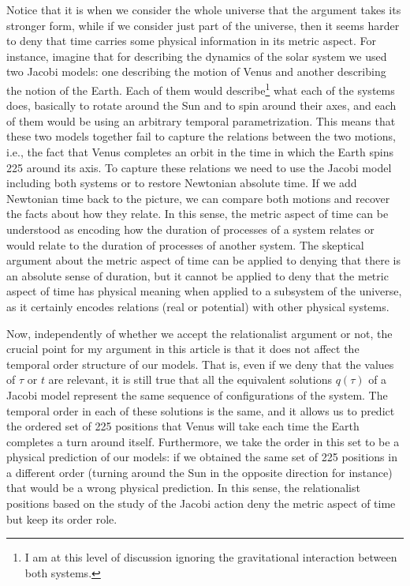 \documentclass[12 pt]{article}
\begin{document}
Notice that it is when we consider the whole universe that the argument takes its stronger form, while if we consider just part of the universe, then it seems harder to deny that time carries some physical information in its metric aspect. For instance, imagine that for describing the dynamics of the solar system we used two Jacobi models: one describing the motion of Venus and another describing the notion of the Earth. Each of them would describe\footnote{I am at this level of discussion ignoring the gravitational interaction between both systems.} what each of the systems does, basically to rotate around the Sun and to spin around their axes, and each of them would be using an arbitrary temporal parametrization. This means that these two models together fail to capture the relations between the two motions, i.e., the fact that Venus completes an orbit in the time in which the Earth spins 225 around its axis. To capture these relations we need to use the Jacobi model including both systems or to restore Newtonian absolute time. If we add Newtonian time back to the picture, we can compare both motions and recover the facts about how they relate. In this sense, the metric aspect of time can be understood as encoding how the duration of processes of a system relates or would relate to the duration of processes of another system. The skeptical argument about the metric aspect of time can be applied to denying that there is an absolute sense of duration, but it cannot be applied to deny that the metric aspect of time has physical meaning when applied to a subsystem of the universe, as it certainly encodes relations (real or potential) with other physical systems.

Now, independently of whether we accept the relationalist argument or not, the crucial point for my argument in this article is that it does not affect the temporal order structure of our models. That is, even if we deny that the values of $\tau$ or $t$ are relevant, it is still true that all the equivalent solutions $q(\tau)$ of a Jacobi model represent the same sequence of configurations of the system. The temporal order in each of these solutions is the same, and it allows us to predict the ordered set of 225 positions that Venus will take each time the Earth completes a turn around itself. Furthermore, we take the order in this set to be a physical prediction of our models: if we obtained the same set of 225 positions in a different order (turning around the Sun in the opposite direction for instance) that would be a wrong physical prediction. In this sense, the relationalist positions based on the study of the Jacobi action deny the metric aspect of time but keep its order role.
\end{document}
